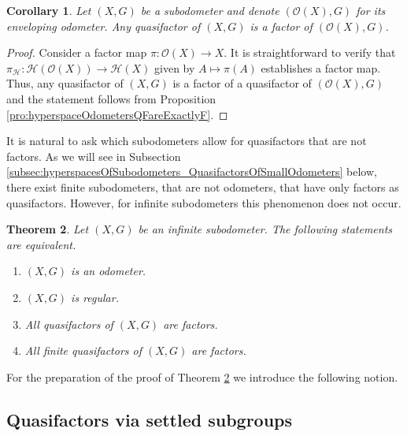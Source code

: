 \documentclass[12pt, reqno]{amsart}
\newtheorem{theorem}{Theorem}[section]
\newtheorem{corollary}[theorem]{Corollary}
\theoremstyle{definition}
\theoremstyle{remark}
\numberwithin{equation}{section}
\theoremstyle{theorem}
\theoremstyle{remark}
\newcommand{\envelopingOdometer}[1]{\mathcal{O}(#1)}
\def\hyper{{\mathcal{H}}}
\begin{document}
\begin{corollary}
\label{cor:hyperspaceQuasifactorsAreFactorsOfEnvelopingOdometer}
    Let $(X,G)$ be a subodometer and denote $(\envelopingOdometer{X},G)$ for its enveloping odometer. Any quasifactor of $(X,G)$ is a factor of $(\envelopingOdometer{X},G)$.  
\end{corollary}
\begin{proof}
    Consider a factor map $\pi\colon \envelopingOdometer{X}\to X$. 
    It is straightforward to verify that $\pi_\hyper \colon \hyper(\envelopingOdometer{X})\to \hyper(X)$ given by $A\mapsto \pi(A)$ establishes a factor map. 
    Thus, any quasifactor of $(X,G)$ is a factor of a quasifactor of $(\envelopingOdometer{X},G)$ and the statement follows from Proposition \ref{pro:hyperspaceOdometersQFareExactlyF}. 
\end{proof}

It is natural to ask which subodometers allow for quasifactors that are not factors. 
As we will see in Subsection \ref{subsec:hyperspacesOfSubodometers_QuasifactorsOfSmallOdometers} below, there exist finite subodometers, that are not odometers, that have only factors as quasifactors.
However, for infinite subodometers this phenomenon does not occur. 

\begin{theorem}
\label{the:hyperspaceCharacterizationOdometerViaQuasifactors}
    Let $(X,G)$ be an infinite subodometer. 
    The following statements are equivalent.
    \begin{enumerate}[label=(\roman*)]
        \item \label{enu:qfXodometer}
            $(X,G)$ is an odometer.
        \item \label{enu:qfXregular}
            $(X,G)$ is regular. 
        \item \label{enu:qfallQFareF}
            All quasifactors of $(X,G)$ are factors. 
        \item \label{enu:qfallfinQFareF}
            All finite quasifactors of $(X,G)$ are factors. 
    \end{enumerate}
\end{theorem}

For the preparation of the proof of Theorem \ref{the:hyperspaceCharacterizationOdometerViaQuasifactors} we introduce the following notion. 

\subsection{Quasifactors via settled subgroups}
\label{subsec:hyperspacesOfSubodometers_quasifactorsViaSettledSubgroups}
\end{document}
